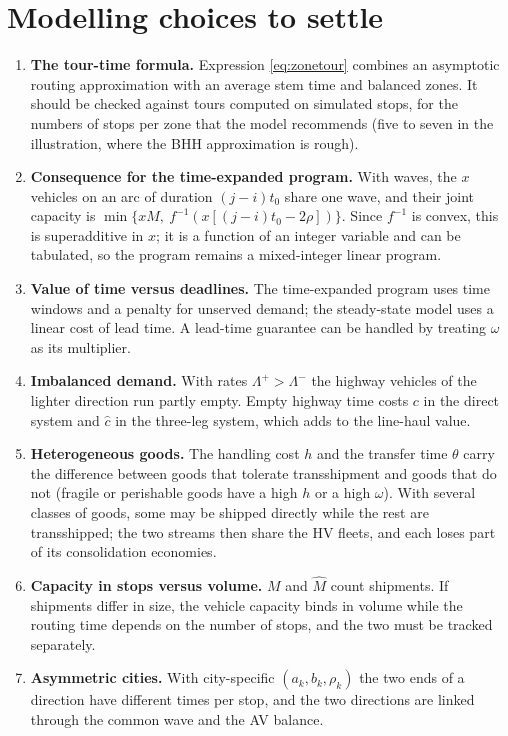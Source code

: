 \documentclass[10pt, reqno]{amsart}
\theoremstyle{definition}
\begin{document}
\section{Modelling choices to settle}

\begin{enumerate}
\item \textbf{The tour-time formula.} Expression \eqref{eq:zonetour} combines an asymptotic routing approximation with an average stem time and balanced zones. It should be checked against tours computed on simulated stops, for the numbers of stops per zone that the model recommends (five to seven in the illustration, where the BHH approximation is rough).
\item \textbf{Consequence for the time-expanded program.} With waves, the $x$ vehicles on an arc of duration $(j-i)t_0$ share one wave, and their joint capacity is $\min\{xM,\ f^{-1}(x[(j-i)t_0-2\rho])\}$. Since $f^{-1}$ is convex, this is superadditive in $x$; it is a function of an integer variable and can be tabulated, so the program remains a mixed-integer linear program.
\item \textbf{Value of time versus deadlines.} The time-expanded program uses time windows and a penalty for unserved demand; the steady-state model uses a linear cost of lead time. A lead-time guarantee can be handled by treating $\omega$ as its multiplier.
\item \textbf{Imbalanced demand.} With rates $\Lambda^+>\Lambda^-$ the highway vehicles of the lighter direction run partly empty. Empty highway time costs $c$ in the direct system and $\hat c$ in the three-leg system, which adds to the line-haul value.
\item \textbf{Heterogeneous goods.} The handling cost $h$ and the transfer time $\theta$ carry the difference between goods that tolerate transshipment and goods that do not (fragile or perishable goods have a high $h$ or a high $\omega$). With several classes of goods, some may be shipped directly while the rest are transshipped; the two streams then share the HV fleets, and each loses part of its consolidation economies.
\item \textbf{Capacity in stops versus volume.} $M$ and $\hat M$ count shipments. If shipments differ in size, the vehicle capacity binds in volume while the routing time depends on the number of stops, and the two must be tracked separately.
\item \textbf{Asymmetric cities.} With city-specific $(a_k,b_k,\rho_k)$ the two ends of a direction have different times per stop, and the two directions are linked through the common wave and the AV balance.
\end{enumerate}
\end{document}
